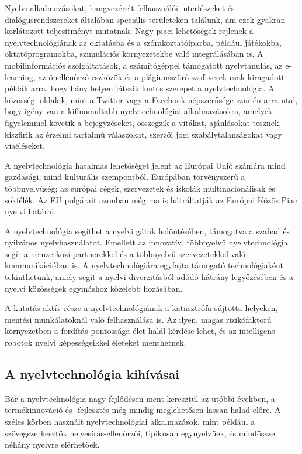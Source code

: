 \begin{multicols}{2}
  Nyelvi alkalmazásokat, hangvezérelt felhasználói interfészeket és dialógusrendszereket általában speciális területeken találunk, ám ezek gyakran korlátozott teljesítményt mutatnak. Nagy piaci le\-he\-tő\-sé\-gek rejlenek a nyelvtechnológiának az oktatásba és a szórakoztatóiparba, például játékokba, oktatóprogramokba, szimulációs környezetekbe való in\-teg\-rá\-lá\-sá\-ban is. A mobilinformációs szolgáltatások, a számítógéppel támogatott nyelvtanulás, az e-learning, az önellenőrző esz\-kö\-zök és a plágiumszűrő szoftverek csak kiragadott példák arra, hogy hány helyen játszik fontos szerepet a nyelvtechnológia. A közösségi oldalak, mint a Twitter vagy a Facebook népszerűsége szintén arra utal, hogy igény van a kifinomultabb nyelvtechnológiai alkalmazásokra, amelyek figyelemmel követik a bejegyzéseket, összegzik a vitákat, ajánlásokat tesznek, kiszűrik az érzelmi tartalmú válaszokat, szerzői jogi szabálytalanságokat vagy via\-élé\-se\-ket. 

  A nyelvtechnológia hatalmas lehetőséget jelent az Európai Unió számára mind gazdasági, mind kulturális szempontból. Európában törvényszerű a többnyelvűség; az európai cégek, szervezetek és iskolák multinacionálisak és sokfélék. Az EU polgárait azonban még ma is hátráltatják az Európai Közös Piac nyelvi határai.


  A nyelvtechnológia segíthet a nyelvi gátak ledöntésében, támogatva a szabad és nyilvános nyelvhasználatot. Emellett az innovatív, többnyelvű nyelvtechnológia segít a nemzetközi partnerekkel és a többnyelvű szervezetekkel való kommunikációban is. A nyelvtechnológiára egyfajta támogató technológiaként tekinthetünk, amely segít a nyelvi diverzitásból adódó hátrány legyőzésében és a nyelvi kö\-zös\-sé\-gek egymáshoz közelebb hozásában.

  A kutatás aktív része a nyelvtechnológiának a katasztrófa sújtotta helyeken, mentési munkálatoknál való felhasználása is. Az ilyen, magas rizikófaktorú kör\-nye\-zet\-ben a fordítás pontossága élet-halál kérdése lehet, és az intelligens robotok nyelvi képességeikkel életeket menthetnek. 

  \subsection{A nyelvtechnológia kihívásai}

  Bár a nyelvtechnológia nagy fejlődésen ment keresztül az utóbbi években, a termékinnováció és -fejlesztés még mindig meglehetősen lassan halad előre. A széles körben használt nyelvtechnológiai al\-kal\-ma\-zá\-sok, mint például a szö\-veg\-szer\-kesz\-tők helyesírás-ellenőrzői, tipikusan egynyelvűek, és mindössze néhány nyelvre elérhetőek.


\end{multicols}
